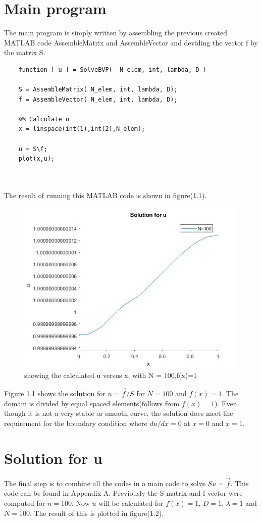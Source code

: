 \documentclass[a4paper]{report}
\begin{document}
\section{Main program}

The main program is simply written by assembling the previous created MATLAB code AssembleMatrix and AssembleVector and deviding the vector f by the matrix S.
\begin{lstlisting}
	function [ u ] = SolveBVP(  N_elem, int, lambda, D )
	
	S = AssembleMatrix( N_elem, int, lambda, D);
	f = AssembleVector( N_elem, int, lambda, D);
	
	%% Calculate u
	x = linspace(int(1),int(2),N_elem);
	
	u = S\f;
	plot(x,u); 
	
	
\end{lstlisting}
The result of running this MATLAB code is shown in figure(1.1).

\begin{figure}[ht!]
	\centering
	\includegraphics[width=150mm]{1Df1.jpg}
	\caption{showing the calculated u versus x, with N = 100,f(x)=1 \label{overflow}}
\end{figure}
\newpage

Figure 1.1 shows the solution for $u=\vec{f}/S$ for $N=100$ and $f(x)=1$. The domain is divided by equal spaced elements(follows from $f(x)=1$). Even though it is not a very stable or smooth curve, the solution does meet the requirement for the boundary condition where $du/dx=0$ at $x=0$ and $x=1$.

\section{Solution for u}
The final step is to combine all the codes in a main code to solve $Su= \vec{f}$. This code can be found in Appendix A. Previously the S matrix and f vector were computed for $n = 100$. Now $u$ will be calculated for $f(x)=1$, $D=1$, $\lambda = 1$ and $N = 100$. The result of this is plotted in figure(1.2). 
\end{document}
